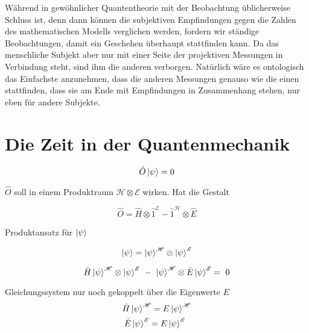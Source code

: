 \documentclass[12pt]{article}
\begin{document}
Während in gewöhnlicher Quantentheorie mit der Beobachtung üblicherweise Schluss ist, denn dann können die subjektiven Empfindungen gegen die Zahlen des mathematischen Modells verglichen werden, fordern wir ständige Beobachtungen, damit ein Geschehen überhaupt stattfinden kann. Da das menschliche Subjekt aber nur mit einer Seite der projektiven Messungen in Verbindung steht, sind ihm die anderen verborgen. Natürlich wäre es ontologisch das Einfachste anzunehmen, dass die anderen Messungen genauso wie die einen stattfinden, dass sie am Ende mit Empfindungen in Zusammenhang stehen, nur eben für andere Subjekte. 

\section{Die Zeit in der Quantenmechanik}

\begin{equation} 
\hat{O}\ket{\psi} = 0 
\end{equation}

$\hat{O}$ soll in einem Produktraum $\mathscr{H} \otimes \mathscr{E}$ wirken. Hat die Gestalt 

\begin{equation} 
\hat{O} = \hat{H} \otimes \hat{1}^{\mathscr{E}} - \hat{1}^{\mathscr{H}} \otimes \hat{E}
\end{equation}

Produktansatz für $\ket{\psi}$

\begin{equation} 
\ket{\psi} = \ket{\psi}^{\mathscr{H}} \otimes \ket{\psi}^{\mathscr{E}}
\end{equation}

\begin{equation} 
\hat{H}\ket{\psi}^{\mathscr{H}} \otimes \ket{\psi}^{\mathscr{E}} 
\ - \ 
\ket{\psi}^{\mathscr{H}} \otimes \hat{E}\ket{\psi}^{\mathscr{E}} =\ 0
\end{equation}

Gleichungssystem nur noch gekoppelt über die Eigenwerte $E$
\begin{equation}
\begin{split}
\hat{H}\ket{\psi}^{\mathscr{H}} = E\ket{\psi}^{\mathscr{H}}\\
\hat{E}\ket{\psi}^{\mathscr{E}} = E\ket{\psi}^{\mathscr{E}}\ \ 
\end{split}
\end{equation}
\end{document}

